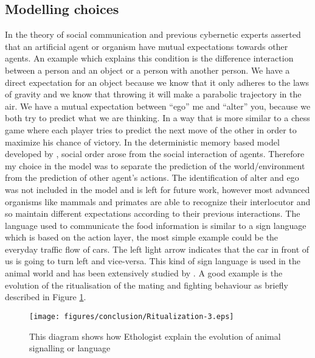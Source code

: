 \subsection{Modelling choices}
In the theory of social communication \citet{Luhmann95} and previous cybernetic
 experts asserted that an artificial agent or organism have mutual expectations
 towards other agents. An example which explains this condition is
 the difference interaction between a person and an object or a person with another person.
We have a direct expectation for an object because we know that it only adheres to the
 laws of gravity and we know that throwing it will make a parabolic trajectory in the air.
We have a mutual expectation between ``ego'' me and ``alter'' you, because we both try
 to predict what we are thinking. In a way that is more similar to a chess game where each
 player tries to predict the next move of the other in order to maximize his chance of victory.
In the deterministic memory based model developed by \citet{SocialOrderScalability}, social
 order arose from the social interaction of agents.
Therefore my choice in the model was to separate the prediction of the world/environment from the
 prediction of other agent's actions.
The identification of alter and ego was not included in the model and is left for future work,
however most advanced organisms like mammals and primates are able to recognize their
interlocutor and so maintain different expectations according to their previous interactions.
The language used to communicate the food information is similar to a sign language which is based
on the action layer, the most simple example could be the everyday traffic flow of cars.
The left light arrow indicates that the car in front of us is going to turn left and vice-versa.
This kind of sign language is used in the animal world and has been extensively studied by 
\citet{AnimalSignals}.
A good example is the evolution of the ritualisation of the mating and fighting behaviour
as briefly described in Figure \ref{fig:conclusion:ritualizationmodel}.

\begin{figure}[htbp]
\begin{center}
\texttt{[image: figures/conclusion/Ritualization-3.eps]}
\end{center}
\vspace*{4pt}
\caption[Ritualization model]{This diagram shows how Ethologist explain
the evolution of animal signalling or language 
\label{fig:conclusion:ritualizationmodel}}
\end{figure}

